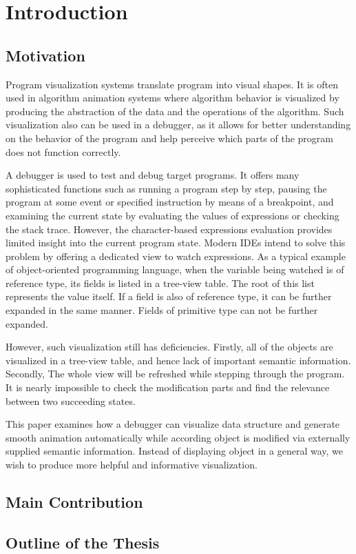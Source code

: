 \chapter {Introduction}

\section {Motivation}
Program visualization systems translate program into visual shapes. It is often used in algorithm animation systems where algorithm behavior is visualized by producing the abstraction of the data and the operations of the algorithm. Such visualization also can be used in a debugger, as it allows for better understanding on the behavior of the program and help perceive which parts of the program does not function correctly.

A debugger is used to test and debug target programs. It offers many sophisticated functions such as running a program step by step, pausing the program at some event or specified instruction by means of a breakpoint, and examining the current state by evaluating the values of expressions or checking the stack trace. However, the character-based expressions evaluation provides limited insight into the current program state. Modern IDEs intend to solve this problem by offering a dedicated view to watch expressions. As a typical example of object-oriented programming language, when the variable being watched is of reference type, its fields is listed in a tree-view table. The root of this list represents the value itself. If a field is also of reference type, it can be further expanded in the same manner. Fields of primitive type can not be further expanded.

However, such visualization still has deficiencies. Firstly, all of the objects are visualized in a tree-view table, and hence lack of important semantic information. Secondly, The whole view will be refreshed while stepping through the program. It is nearly impossible to check the modification parts and find the relevance between two succeeding states.

This paper examines how a debugger can visualize data structure and generate smooth animation automatically while according object is modified via externally supplied semantic information. Instead of displaying object in a general way, we wish to produce more helpful and informative visualization.

\section {Main Contribution}

\section {Outline of the Thesis}